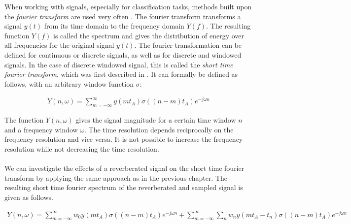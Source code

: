 When working with signals, especially for classification tasks, methods built upon the \textit{fourier transform} are used very often \cite{zhan1997vocal} \cite{davis1990comparison} \cite{kitasr2018stueker}. The fourier transform transforms a signal $y(t)$ from its time domain to the frequency domain $Y(f)$. The resulting function $Y(f)$ is called the spectrum and gives the distribution of energy over all frequencies for the original signal $y(t)$. The fourier transformation can be defined for continuous or discrete signals, as well as for discrete and windowed signals. In the case of discrete windowed signal, this is called the \textit{short time fourier transform}, which was first described in \cite{gabor1946theory}. It can formally be defined as follows, with an arbitrary window function $\sigma$:

\begin{align}
Y(n, \omega) = \sum_{m = -\infty}^{\infty} y(mt_A) \sigma((n - m)t_A) e^{-j \omega n}  
\label{eq:stft}
\end{align}

The function $Y(n, \omega)$ gives the signal magnitude for a certain time window $n$ and a frequency window $\omega$. The time resolution depends reciprocally on the frequency resolution and vice versa. It is not possible to increase the frequency resolution while not decreasing the time resolution.\\ \\

We can investigate the effects of a reverberated signal on the short time fourier transform by applying the same approach as in the previous chapter. The resulting short time fourier spectrum of the reverberated and sampled signal is given as follows.

\begin{align}
Y(n, \omega) = \sum_{m = -\infty}^{\infty} w_0 y(mt_A) \sigma((n - m)t_A) e^{-j \omega n} + 
\sum_{m = -\infty}^{\infty} \sum_{n} w_n y(mt_A - t_n) \sigma((n - m)t_A) e^{-j \omega n}  
\label{eq:stftnoise}
\end{align}

